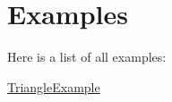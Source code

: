 \section{Examples}
Here is a list of all examples\-:\begin{DoxyCompactItemize}
\item 
\hyperlink{TriangleExample-example}{Triangle\-Example}
\end{DoxyCompactItemize}
